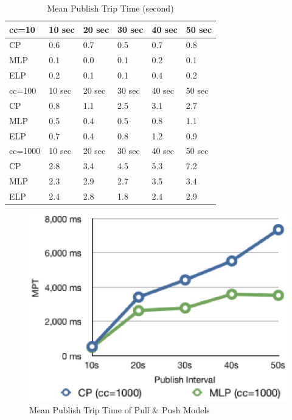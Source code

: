\begin{table}
\centering \caption{\label{tb:mpt_all} Mean Publish Trip Time (second)}
\begin{tabular}{|l|l|l|l|l|l|}
    \hline cc=10 & 10 sec & 20 sec & 30 sec & 40 sec & 50 sec \\
    \hline CP & 0.6 & 0.7 & 0.5 & 0.7 & 0.8 \\
    \hline MLP & 0.1 & 0.0 & 0.1 & 0.2 & 0.1 \\
    \hline ELP & 0.2 & 0.1 & 0.1 & 0.4 & 0.2 \\
    \hline
    \hline cc=100 & 10 sec & 20 sec & 30 sec & 40 sec & 50 sec \\
    \hline CP & 0.8 & 1.1 & 2.5 & 3.1 & 2.7 \\
    \hline MLP & 0.5 & 0.4 & 0.5 & 0.8 & 1.1 \\
    \hline ELP & 0.7 & 0.4 & 0.8 & 1.2 & 0.9 \\
    \hline
    \hline cc=1000& 10 sec & 20 sec & 30 sec & 40 sec & 50 sec \\
    \hline CP & 2.8 & 3.4 & 4.5 & 5.3 & 7.2 \\
    \hline MLP & 2.3 & 2.9 & 2.7 & 3.5 & 3.4 \\
    \hline ELP & 2.4 & 2.8 & 1.8 & 2.4 & 2.9 \\
    \hline
\end{tabular}
\end{table}

\begin{figure}[htb!]
\centering%
    \includegraphics[scale=0.70]{figures/latency.eps}
    \caption{Mean Publish Trip Time of Pull \& Push Models}
    \label{fig:traffic_latency}
\end{figure}

